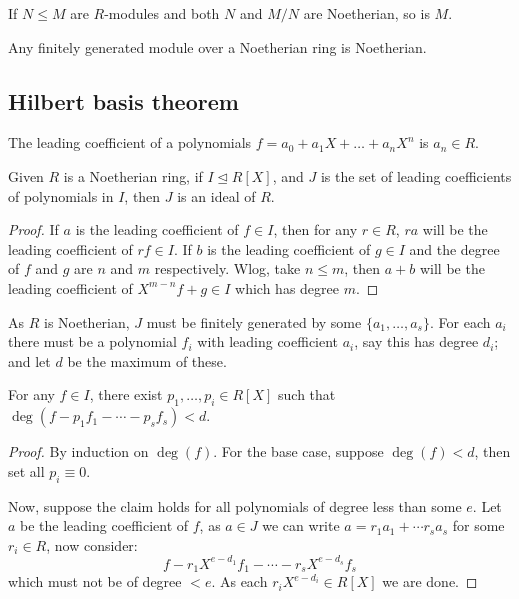 \documentclass{article}
\begin{document}
\begin{proposition}
    If $N\leq M$ are $R$-modules and both $N$ and $M/N$ are Noetherian, so is $M$.
\end{proposition}

\begin{corollary}
    Any finitely generated module over a Noetherian ring is Noetherian.
\end{corollary}

\subsection{Hilbert basis theorem}

The leading coefficient of a polynomials $f = a_0 + a_1X + \ldots + a_nX^n$ is $a_n\in R$.

\begin{lemma}
    Given $R$ is a Noetherian ring, if $I\unlhd R[X]$, and $J$ is the set of leading coefficients of polynomials in $I$, then $J$ is an ideal of $R$.
    \begin{proof}
        If $a$ is the leading coefficient of $f\in I$, then for any $r\in R$, $ra$ will be the leading coefficient of $rf\in I$. If $b$ is the leading coefficient of $g\in I$ and the degree of $f$ and $g$ are $n$ and $m$ respectively. Wlog, take $n\leq m$, then $a+b$ will be the leading coefficient of $X^{m-n}f + g \in I$ which has degree $m$.
    \end{proof}
\end{lemma}

As $R$ is Noetherian, $J$ must be finitely generated by some $\{a_1,\ldots,a_s\}$. For each $a_i$ there must be a polynomial $f_i$ with leading coefficient $a_i$, say this has degree $d_i$; and let $d$ be the maximum of these.

\begin{lemma}
    For any $f\in I$, there exist $p_1,\ldots,p_i\in R[X]$ such that $\deg(f-p_1f_1-\cdots -p_sf_s) < d$.
    \begin{proof}
        By induction on $\deg(f)$. For the base case, suppose $\deg(f) < d$, then set all $p_i\equiv 0$. 
        
        Now, suppose the claim holds for all polynomials of degree less than some $e$. Let $a$ be the leading coefficient of $f$, as $a\in J$ we can write $a=r_1a_1 + \cdots r_sa_s$ for some $r_i\in R$, now consider: \[
        f - r_1X^{e-d_1}f_1 - \cdots - r_sX^{e-d_s}f_s
        \] which must not be of degree $< e$. As each $r_iX^{e-d_i}\in R[X]$ we are done.
    \end{proof}
\end{lemma}
\end{document}

